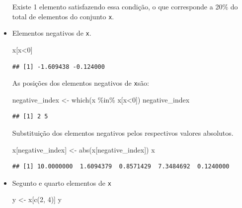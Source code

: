 \documentclass[
]{article}
\newenvironment{Shaded}{\begin{snugshade}}{\end{snugshade}}
\newcommand{\DecValTok}[1]{\textcolor[rgb]{0.00,0.00,0.81}{#1}}
\newcommand{\FunctionTok}[1]{\textcolor[rgb]{0.00,0.00,0.00}{#1}}
\newcommand{\NormalTok}[1]{#1}
\newcommand{\OtherTok}[1]{\textcolor[rgb]{0.56,0.35,0.01}{#1}}
\newcommand{\SpecialCharTok}[1]{\textcolor[rgb]{0.00,0.00,0.00}{#1}}
\begin{document}
\begin{itemize}
  Existe 1 elemento satisfazendo essa condição, o que corresponde a 20\% do total de elementos do conjunto \texttt{x}.
\item
  Elementos negativos de \texttt{x}.

\begin{Shaded}
\begin{Highlighting}[]
\NormalTok{x[x}\SpecialCharTok{\textless{}}\DecValTok{0}\NormalTok{]}
\end{Highlighting}
\end{Shaded}

\begin{verbatim}
## [1] -1.609438 -0.124000
\end{verbatim}

  As posições dos elementos negativos de \texttt{x}são:

\begin{Shaded}
\begin{Highlighting}[]
\NormalTok{negative\_index }\OtherTok{\textless{}{-}} \FunctionTok{which}\NormalTok{(x }\SpecialCharTok{\%in\%}\NormalTok{ x[x}\SpecialCharTok{\textless{}}\DecValTok{0}\NormalTok{])}
\NormalTok{negative\_index}
\end{Highlighting}
\end{Shaded}

\begin{verbatim}
## [1] 2 5
\end{verbatim}

  Substituição dos elementos negativos pelos respectivos valores absolutos.

\begin{Shaded}
\begin{Highlighting}[]
\NormalTok{x[negative\_index] }\OtherTok{\textless{}{-}} \FunctionTok{abs}\NormalTok{(x[negative\_index])}
\NormalTok{x}
\end{Highlighting}
\end{Shaded}

\begin{verbatim}
## [1] 10.0000000  1.6094379  0.8571429  7.3484692  0.1240000
\end{verbatim}
\item
  Segunto e quarto elementos de \texttt{x}

\begin{Shaded}
\begin{Highlighting}[]
\NormalTok{y }\OtherTok{\textless{}{-}}\NormalTok{ x[}\FunctionTok{c}\NormalTok{(}\DecValTok{2}\NormalTok{, }\DecValTok{4}\NormalTok{)]}
\NormalTok{y}
\end{Highlighting}
\end{Shaded}


\end{itemize}
\end{document}
